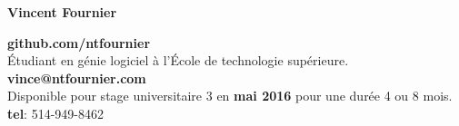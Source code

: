 \documentclass{res}
\newcommand{\inFrench}[1]{#1}
\newcommand{\inEnglish}[1]{}
\begin{document}
\thispagestyle{empty} %

{\bf\huge Vincent Fournier}
\inFrench{
	\hfill \textbf {github.com/ntfournier} \\
	Étudiant en génie logiciel à l’École de technologie supérieure.
	\hfill \textbf {vince@ntfournier.com} \\
	Disponible pour stage universitaire 3 en \textbf{mai 2016} pour une durée 4 ou 8 mois.
	\hfill \textbf {tel}: 514-949-8462 \\
}
\inEnglish{
	\hfill \textbf {github.com/ntfournier} \\
	Software engineering student at l'École de technologie supérieure.
	\hfill \textbf {vince@ntfournier.com} \\
	Available for third university internship in \textbf{May 2016} for a length 4 or 8 months.
	\hfill \textbf {tel}: 514-949-8462 \\
}
\vspace{-15pt}
\end{document}
